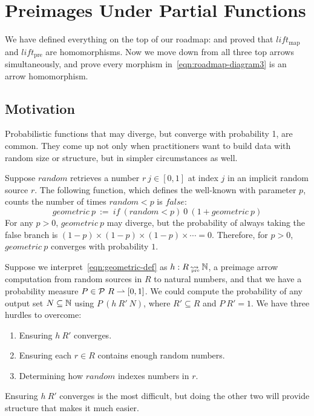 \documentclass[preprint]{sigplanconf}
\newcommand{\arrow}{\rightsquigarrow}
\newcommand{\pto}{\rightharpoonup}
\newcommand{\arrowlift}{\ensuremath{lift}}
\newcommand{\map}{_\mathrm{map}}
\newcommand{\liftmap}{\arrowlift\map}
\newcommand{\pre}{_\mathrm{pre}}
\DeclareMathOperator{\preto}{\arrow_{\mspace{-19mu}\pre}}
\newcommand{\liftpre}{\arrowlift\pre}
\begin{document}

\section{Preimages Under Partial Functions}

We have defined everything on the top of our roadmap:
and proved that $\liftmap$ and $\liftpre$ are homomorphisms.
Now we move down from all three top arrows simultaneously, and prove every morphism in~\eqref{eqn:roadmap-diagram3} is an arrow homomorphism.

\subsection{Motivation}

Probabilistic functions that may diverge, but converge with probability 1, are common.
They come up not only when practitioners want to build data with random size or structure, but in simpler circumstances as well.

Suppose $random$ retrieves a number $r~j \in [0,1]$ at index $j$ in an implicit random source $r$.
The following function, which defines the well-known  with parameter $p$, counts the number of times $random < p$ is $false$:
\begin{equation}
	geometric~p \ := \ if~(random < p)~0~(1 + geometric~p)
\label{eqn:geometric-def}
\end{equation}
For any $p > 0$, $geometric~p$ may diverge, but the probability of always taking the false branch is $(1-p) \times (1-p) \times (1-p) \times \cdots = 0$.
Therefore, for $p > 0$, $geometric~p$ converges with probability $1$.

Suppose we interpret~\eqref{eqn:geometric-def} as $h : R \preto \Nat$, a preimage arrow computation from random sources in $R$ to natural numbers, and that we have a probability measure $P \in \powerset~R \pto [0,1]$.
We could compute the probability of any output set $N \subseteq \mathbb{N}$ using $P~(h~R'~N)$, where $R' \subseteq R$ and $P~R' = 1$. We have three hurdles to overcome:
\begin{enumerate}
	\item Ensuring $h~R'$ converges.
	\item Ensuring each $r \in R$ contains enough random numbers.
	\item Determining how $random$ indexes numbers in $r$.
\end{enumerate}
Ensuring $h~R'$ converges is the most difficult, but doing the other two will provide structure that makes it much easier.
\end{document}
